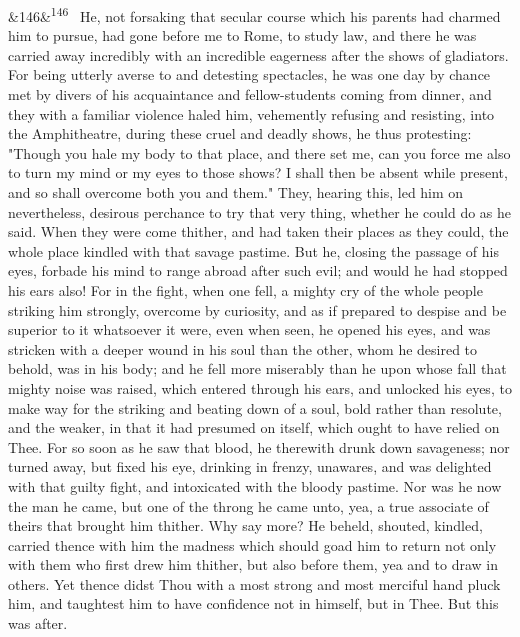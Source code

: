 \documentclass[12pt]{article}
\newcommand{\para}[1][]{\par\noindent\ifx&#1&\else\textsuperscript{\footnotesize #1}~\fi}
\begin{document}
\para[146] He, not forsaking that secular course which his parents had charmed him to pursue, had gone before me to Rome, to study law, and there he was carried away incredibly with an incredible eagerness after the shows of gladiators. For being utterly averse to and detesting spectacles, he was one day by chance met by divers of his acquaintance and fellow-students coming from dinner, and they with a familiar violence haled him, vehemently refusing and resisting, into the Amphitheatre, during these cruel and deadly shows, he thus protesting: "Though you hale my body to that place, and there set me, can you force me also to turn my mind or my eyes to those shows? I shall then be absent while present, and so shall overcome both you and them." They, hearing this, led him on nevertheless, desirous perchance to try that very thing, whether he could do as he said. When they were come thither, and had taken their places as they could, the whole place kindled with that savage pastime. But he, closing the passage of his eyes, forbade his mind to range abroad after such evil; and would he had stopped his ears also! For in the fight, when one fell, a mighty cry of the whole people striking him strongly, overcome by curiosity, and as if prepared to despise and be superior to it whatsoever it were, even when seen, he opened his eyes, and was stricken with a deeper wound in his soul than the other, whom he desired to behold, was in his body; and he fell more miserably than he upon whose fall that mighty noise was raised, which entered through his ears, and unlocked his eyes, to make way for the striking and beating down of a soul, bold rather than resolute, and the weaker, in that it had presumed on itself, which ought to have relied on Thee. For so soon as he saw that blood, he therewith drunk down savageness; nor turned away, but fixed his eye, drinking in frenzy, unawares, and was delighted with that guilty fight, and intoxicated with the bloody pastime. Nor was he now the man he came, but one of the throng he came unto, yea, a true associate of theirs that brought him thither. Why say more? He beheld, shouted, kindled, carried thence with him the madness which should goad him to return not only with them who first drew him thither, but also before them, yea and to draw in others. Yet thence didst Thou with a most strong and most merciful hand pluck him, and taughtest him to have confidence not in himself, but in Thee. But this was after.
\end{document}

